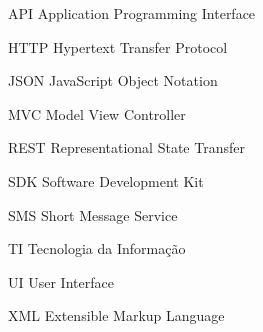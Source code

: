 
\begin{siglas}
 \item[API] Application Programming Interface
 \item[HTTP] Hypertext Transfer Protocol
 \item[JSON] JavaScript Object Notation
 \item[MVC] Model View Controller
 \item[REST] Representational State Transfer
 \item[SDK] Software Development Kit
 \item[SMS] Short Message Service
 \item[TI] Tecnologia da Informação
 \item[UI] User Interface
 \item[XML] Extensible Markup Language
\end{siglas}
